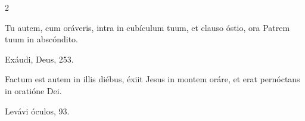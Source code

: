 \documentclass[9pt,twoside]{extarticle}
\begin{document}
\begin{multicols}{2}
\begin{tightlist}{}
\item {} Tu autem, cum oráveris, intra in cubículum tuum, et clauso óstio, ora Patrem tuum in abscóndito.
\item {} Exáudi, Deus, 253.
\end{tightlist}

%
%
%
%
%
%
%
%
%
%
%
%

\begin{tightlist}{}
\item {} Factum est autem in illis diébus, éxiit Jesus in montem oráre, et erat pernóctans in oratióne Dei.
\item {} Levávi óculos, 93.
\end{tightlist}

%
%
%
%
%
%
%
%
%


\end{multicols}
\end{document}
